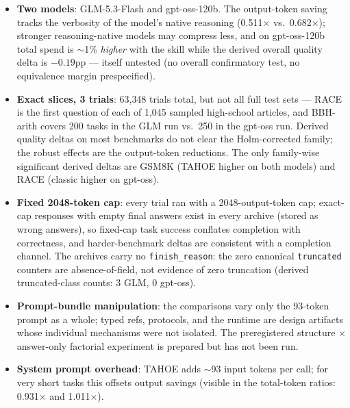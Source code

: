 \documentclass[11pt,a4paper]{article}
\begin{document}
\begin{itemize}[nosep,leftmargin=*]
    \item \textbf{Two models}: GLM-5.3-Flash and gpt-oss-120b. The output-token saving tracks the verbosity of the model's native reasoning (0.511$\times$ vs.\ 0.682$\times$); stronger reasoning-native models may compress less, and on gpt-oss-120b total spend is $\sim$1\% \emph{higher} with the skill while the derived overall quality delta is $-0.19$pp --- itself untested (no overall confirmatory test, no equivalence margin prespecified).
    \item \textbf{Exact slices, 3 trials}: 63{,}348 trials total, but not all full test sets --- RACE is the first question of each of 1{,}045 sampled high-school articles, and BBH-arith covers 200 tasks in the GLM run vs.\ 250 in the gpt-oss run. Derived quality deltas on most benchmarks do not clear the Holm-corrected family; the robust effects are the output-token reductions. The only family-wise significant derived deltas are GSM8K (TAHOE higher on both models) and RACE (classic higher on gpt-oss).
    \item \textbf{Fixed 2048-token cap}: every trial ran with a 2048-output-token cap; exact-cap responses with empty final answers exist in every archive (stored as wrong answers), so fixed-cap task success conflates completion with correctness, and harder-benchmark deltas are consistent with a completion channel. The archives carry no \texttt{finish\_reason}: the zero canonical \texttt{truncated} counters are absence-of-field, not evidence of zero truncation (derived truncated-class counts: 3 GLM, 0 gpt-oss).
    \item \textbf{Prompt-bundle manipulation}: the comparisons vary only the 93-token prompt as a whole; typed refs, protocols, and the runtime are design artifacts whose individual mechanisms were not isolated. The preregistered structure $\times$ answer-only factorial experiment is prepared but has not been run.
    \item \textbf{System prompt overhead}: TAHOE adds $\sim$93 input tokens per call; for very short tasks this offsets output savings (visible in the total-token ratios: 0.931$\times$ and 1.011$\times$).

\end{itemize}
\end{document}
